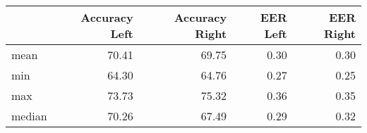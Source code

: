 \begin{tabular}{lrrrr}
\toprule
{} &  Accuracy Left &  Accuracy Right &  EER Left &  EER Right \\
\midrule
mean   &          70.41 &           69.75 &      0.30 &       0.30 \\
min    &          64.30 &           64.76 &      0.27 &       0.25 \\
max    &          73.73 &           75.32 &      0.36 &       0.35 \\
median &          70.26 &           67.49 &      0.29 &       0.32 \\
\bottomrule
\end{tabular}
